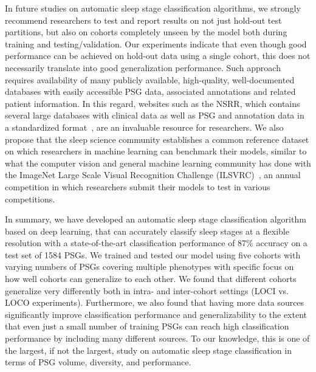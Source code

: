 In future studies on automatic sleep stage classification algorithms, we strongly recommend researchers to test and report results on not just hold-out test partitions, but also on cohorts completely unseen by the model both during training and testing/validation.
Our experiments indicate that even though good performance can be achieved on hold-out data using a single cohort, this does not necessarily translate into good generalization performance.
Such approach requires availability of many publicly available, high-quality, well-documented databases with easily accessible PSG data, associated annotations and related patient information.
In this regard, websites such as the NSRR, which contains several large databases with clinical data as well as PSG and annotation data in a standardized format~\cite{Dean2016,Zhang2018}, are an invaluable resource for researchers. 
We also propose that the sleep science community establishes a common reference dataset on which researchers in machine learning can benchmark their models, similar to what the computer vision and general machine learning community has done with the ImageNet Large Scale Visual Recognition Challenge (ILSVRC)~\cite{Russakovsky2015}, an annual competition in which researchers submit their models to test in various competitions.

In summary, we have developed an automatic sleep stage classification algorithm based on deep learning, that can accurately classify sleep stages at a flexible resolution with a state-of-the-art classification performance of 87\% accuracy on a test set of 1584 PSGs.
We trained and tested our model using five cohorts with varying numbers of PSGs covering multiple phenotypes with specific focus on how well cohorts can generalize to each other.
We found that different cohorts generalize very differently both in intra- and inter-cohort settings (LOCI vs. LOCO experiments).
Furthermore, we also found that having more data sources significantly improve classification performance and generalizability to the extent that even just a small number of training PSGs can reach high classification performance by including many different sources.
To our knowledge, this is one of the largest, if not the largest, study on automatic sleep stage classification in terms of PSG volume, diversity, and performance.
